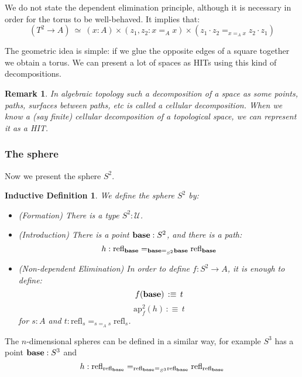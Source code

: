\documentclass{article}
\newcommand{\ssse}[1]{\subsubsection*{#1}}
\newcommand{\U}{{\mathcal U}}
\renewcommand{\r}{\rightarrow}
\newcommand{\ap}{\mathrm{ap}}
\newcommand{\refl}{\mathrm{refl}}
\newcommand{\base}{\mathrm{\bf base}}
\newtheorem{remark}{Remark}
\newtheorem{ind_def}{Inductive Definition}
\begin{document}
We do not state the dependent elimination principle, although it is necessary in order for the torus to be well-behaved. It implies that:
\[(T^2\r A) \ \simeq \ (x:A)\times(z_1,z_2:x=_Ax)\times (z_1\cdot z_2 =_{x=_Ax} z_2\cdot z_1)\]

The geometric idea is simple: if we glue the opposite edges of a square together we obtain a torus. We can present a lot of spaces as HITs using this kind of decompositions.

\begin{remark}
In algebraic topology such a decomposition of a space as some points, paths, surfaces between paths, etc is called a cellular decomposition. When we know a (say finite) cellular decomposition of a topological space, we can represent it as a HIT.
\end{remark}

\ssse{The sphere}

Now we present the sphere $S^2$.

\begin{ind_def}
We define the sphere $S^2$ by:
\begin{itemize}
\item (Formation) There is a type $S^2:\U$.
\item (Introduction) There is a point $\base:S^2$, and there is a path:
\[h:\refl_\base =_{\base=_{S^2}\base}\refl_\base\]
\item (Non-dependent Elimination) In order to define $f:S^2\r A$, it is enough to define:
\[f(\base)\, :\equiv\, t\]
\[\ap^2_f(h) \, :\equiv\, t\]
for $s:A$ and $t:\refl_s=_{s=_As}\refl_s$.
\end{itemize}
\end{ind_def}

The $n$-dimensional spheres can be defined in a similar way, for example $S^3$ has a point $\base:S^3$ and 
\[h:\refl_{\refl_\base} =_{\refl_\base =_{S^3}\refl_\base} \refl_{\refl_\base}\]






\end{document}
